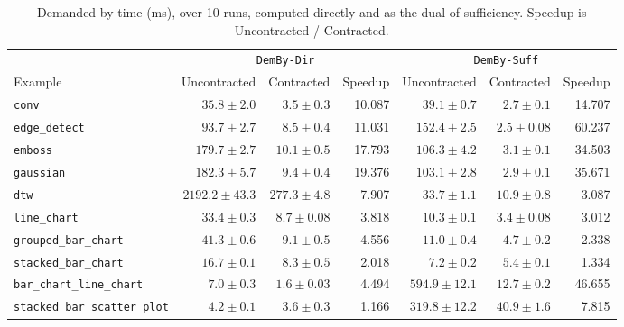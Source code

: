\begin{table}[htbp]
\centering
\small
\begin{tabular}{l r r r r r r}
\toprule
 & \multicolumn{3}{c}{\texttt{DemBy-Dir}} & \multicolumn{3}{c}{\texttt{DemBy-Suff}} \\
\cmidrule(lr){2-4} \cmidrule(lr){5-7}
Example & Uncontracted & Contracted & Speedup & Uncontracted & Contracted & Speedup \\
\midrule
\texttt{conv} & $35.8 \pm 2.0$ & $3.5 \pm 0.3$ & 10.087 & $39.1 \pm 0.7$ & $2.7 \pm 0.1$ & 14.707 \\
\texttt{edge\_detect} & $93.7 \pm 2.7$ & $8.5 \pm 0.4$ & 11.031 & $152.4 \pm 2.5$ & $2.5 \pm 0.08$ & 60.237 \\
\texttt{emboss} & $179.7 \pm 2.7$ & $10.1 \pm 0.5$ & 17.793 & $106.3 \pm 4.2$ & $3.1 \pm 0.1$ & 34.503 \\
\texttt{gaussian} & $182.3 \pm 5.7$ & $9.4 \pm 0.4$ & 19.376 & $103.1 \pm 2.8$ & $2.9 \pm 0.1$ & 35.671 \\
\texttt{dtw} & $2192.2 \pm 43.3$ & $277.3 \pm 4.8$ & 7.907 & $33.7 \pm 1.1$ & $10.9 \pm 0.8$ & 3.087 \\
\texttt{line\_chart} & $33.4 \pm 0.3$ & $8.7 \pm 0.08$ & 3.818 & $10.3 \pm 0.1$ & $3.4 \pm 0.08$ & 3.012 \\
\texttt{grouped\_bar\_chart} & $41.3 \pm 0.6$ & $9.1 \pm 0.5$ & 4.556 & $11.0 \pm 0.4$ & $4.7 \pm 0.2$ & 2.338 \\
\texttt{stacked\_bar\_chart} & $16.7 \pm 0.1$ & $8.3 \pm 0.5$ & 2.018 & $7.2 \pm 0.2$ & $5.4 \pm 0.1$ & 1.334 \\
\texttt{bar\_chart\_line\_chart} & $7.0 \pm 0.3$ & $1.6 \pm 0.03$ & 4.494 & $594.9 \pm 12.1$ & $12.7 \pm 0.2$ & 46.655 \\
\texttt{stacked\_bar\_scatter\_plot} & $4.2 \pm 0.1$ & $3.6 \pm 0.3$ & 1.166 & $319.8 \pm 12.2$ & $40.9 \pm 1.6$ & 7.815 \\
\bottomrule
\end{tabular}
\caption{Demanded-by time (ms), over 10 runs, computed directly and as the dual of sufficiency. Speedup is Uncontracted / Contracted.}
\label{tab:contracted-demby}
\end{table}
